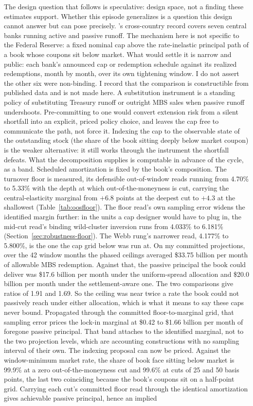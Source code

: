 \documentclass[12pt]{article}
\begin{document}
The design question that follows is speculative: design space, not a finding these estimates support. Whether this episode generalizes is a question this design cannot answer but can pose precisely. \citet{du2024}'s cross-country record covers seven central banks running active and passive runoff. The mechanism here is not specific to the Federal Reserve: a fixed nominal cap above the rate-inelastic principal path of a book whose coupons sit below market. What would settle it is narrow and public: each bank's announced cap or redemption schedule against its realized redemptions, month by month, over its own tightening window. I do not assert the other six were non-binding. I record that the comparison is constructible from published data and is not made here. A substitution instrument is a standing policy of substituting Treasury runoff or outright MBS sales when passive runoff undershoots. Pre-committing to one would convert extension risk from a silent shortfall into an explicit, priced policy choice, and leaves the cap free to communicate the path, not force it. Indexing the cap to the observable state of the outstanding stock (the share of the book sitting deeply below market coupon) is the weaker alternative: it still works through the instrument the shortfall defeats. What the decomposition supplies is computable in advance of the cycle, as a band. Scheduled amortization is fixed by the book's composition. The turnover floor is measured, its defensible out-of-window reads running from 4.70\% to 5.33\% with the depth at which out-of-the-moneyness is cut, carrying the central-elasticity marginal from $+6.8$ points at the deepest cut to $+4.3$ at the shallowest (Table~\ref{tab:oosfloor}). The floor read's own sampling error widens the identified margin further: in the units a cap designer would have to plug in, the mid-cut read's binding wild-cluster inversion runs from 4.033\% to 6.181\% (Section~\ref{sec:robustness-floor}). The Webb rung's narrower read, 4.177\% to 5.800\%, is the one the cap grid below was run at. On my committed projections, over the 42 window months the phased ceilings averaged \$33.75 billion per month of allowable MBS redemption. Against that, the passive principal the book could deliver was \$17.6 billion per month under the uniform-spread allocation and \$20.0 billion per month under the settlement-aware one. The two comparisons give ratios of 1.91 and 1.69. So the ceiling was near twice a rate the book could not passively reach under either allocation, which is what it means to say these caps never bound. Propagated through the committed floor-to-marginal grid, that sampling error prices the lock-in marginal at \$0.42 to \$1.66 billion per month of foregone passive principal. That band attaches to the identified marginal, not to the two projection levels, which are accounting constructions with no sampling interval of their own. The indexing proposal can now be priced. Against the window-minimum market rate, the share of book face sitting below market is 99.9\% at a zero out-of-the-moneyness cut and 99.6\% at cuts of 25 and 50 basis points, the last two coinciding because the book's coupons sit on a half-point grid. Carrying each cut's committed floor read through the identical amortization gives achievable passive principal, hence an implied 
\end{document}
